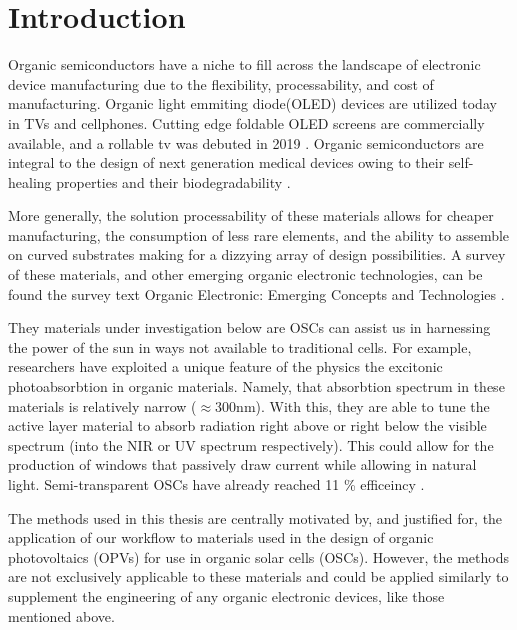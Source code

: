 \chapter{Introduction} 
Organic semiconductors have a niche to fill across the landscape of electronic
device manufacturing due to the flexibility, processability, and cost of manufacturing. 
Organic light emmiting diode(OLED) devices are utilized today in TVs and cellphones.  
Cutting edge foldable OLED screens are commercially available, and a rollable tv was debuted in 2019
\cite{Chen2020}. 
Organic semiconductors are integral to the design of next generation medical devices owing to their
self-healing properties and their biodegradability \cite{Bettinger2010}. 

More generally, the solution processability of these materials allows for
cheaper manufacturing, the consumption of less rare elements, 
and the ability to assemble on curved substrates making for a dizzying array of design possibilities. 
A survey of these materials, and 
other emerging organic electronic technologies, can be found the survey text 
Organic Electronic: Emerging Concepts and Technologies
\cite{FabioCicoiraEditor2013}. 

They materials under investigation below are 
OSCs can assist us in harnessing the power of the sun in ways not available to traditional cells. 
For example, researchers have exploited a unique feature of the physics the excitonic photoabsorbtion in 
organic materials.  Namely, that absorbtion spectrum
in these materials is relatively narrow ($\approx$300nm).
With this, they are able to tune the active layer material to absorb radiation right above or right below the
visible spectrum (into the NIR or UV spectrum respectively). This 
could allow for the production of windows that passively draw current while allowing in natural light. Semi-transparent OSCs have already
reached 11 \% efficeincy \cite{Brabec2020}. 

The methods used in this thesis are centrally motivated by, and justified for, 
the application of our workflow to materials
used in the design of organic photovoltaics (OPVs) for use in organic solar cells (OSCs). However, the methods are
not exclusively applicable to these materials and could be applied similarly to  supplement the engineering of any organic
electronic devices, like those mentioned above. 

